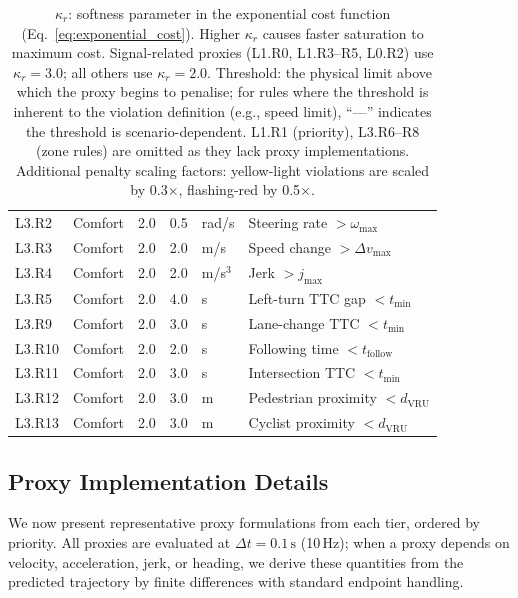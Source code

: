 \begin{table}[t]
\begin{tabular}{llccll}
L3.R2 & Comfort & 2.0 & 0.5 & rad/s & Steering rate $> \omega_{\max}$ \\
L3.R3 & Comfort & 2.0 & 2.0 & m/s & Speed change $> \Delta v_{\max}$ \\
L3.R4 & Comfort & 2.0 & 2.0 & m/s$^3$ & Jerk $> j_{\max}$ \\
L3.R5 & Comfort & 2.0 & 4.0 & s & Left-turn TTC gap $< t_{\min}$ \\
L3.R9 & Comfort & 2.0 & 3.0 & s & Lane-change TTC $< t_{\min}$ \\
L3.R10 & Comfort & 2.0 & 2.0 & s & Following time $< t_{\text{follow}}$ \\
L3.R11 & Comfort & 2.0 & 3.0 & s & Intersection TTC $< t_{\min}$ \\
L3.R12 & Comfort & 2.0 & 3.0 & m & Pedestrian proximity $< d_{\text{VRU}}$ \\
L3.R13 & Comfort & 2.0 & 3.0 & m & Cyclist proximity $< d_{\text{VRU}}$ \\
\bottomrule
\end{tabular}
\vspace{1mm}
\caption*{\footnotesize $\kappa_r$: softness parameter in the exponential cost function (Eq.~\ref{eq:exponential_cost}).  Higher $\kappa_r$ causes faster saturation to maximum cost.  Signal-related proxies (L1.R0, L1.R3--R5, L0.R2) use $\kappa_r{=}3.0$; all others use $\kappa_r{=}2.0$.  Threshold: the physical limit above which the proxy begins to penalise; for rules where the threshold is inherent to the violation definition (e.g., speed limit), ``---'' indicates the threshold is scenario-dependent.  L1.R1 (priority), L3.R6--R8 (zone rules) are omitted as they lack proxy implementations.  Additional penalty scaling factors: yellow-light violations are scaled by 0.3$\times$, flashing-red by 0.5$\times$.}
\end{table}
\subsection{Proxy Implementation Details}
\label{subsec:proxy_details}

We now present representative proxy formulations from each tier, ordered by priority.  All proxies are evaluated at $\Delta t = 0.1\,\mathrm{s}$ (10\,Hz); when a proxy depends on velocity, acceleration, jerk, or heading, we derive these quantities from the predicted trajectory by finite differences with standard endpoint handling.

